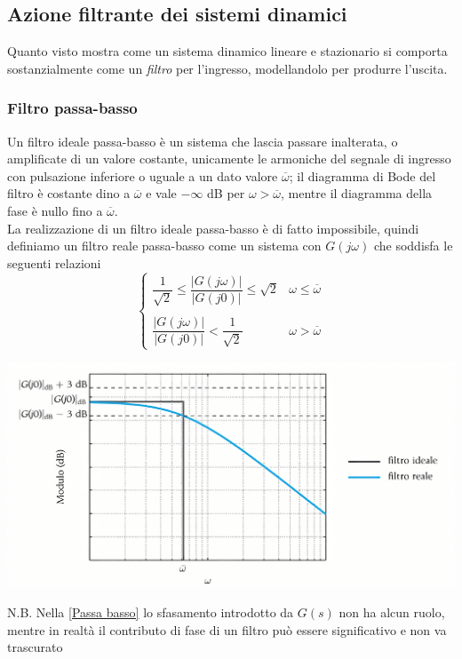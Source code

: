 \documentclass{article}
\numberwithin{equation}{subsection}
\let\oldsubsection\subsection%
\renewcommand{\subsection}{%
  \renewcommand{\theequation}{\thesubsection.\arabic{equation}}%
  \oldsubsection}%
\begin{document}
\subsection{Azione filtrante dei sistemi dinamici}
Quanto visto mostra come un sistema dinamico lineare e stazionario si comporta sostanzialmente come un \textit{filtro} per l'ingresso, modellandolo per produrre l'uscita.

\subsubsection{Filtro passa-basso}
Un filtro ideale passa-basso è un sistema che lascia passare inalterata, o amplificate di un valore costante, unicamente le armoniche del segnale di ingresso con pulsazione inferiore o uguale a un dato valore $\overline{\omega}$; il diagramma di Bode del filtro è costante dino a $\overline{\omega}$ e vale  $-\infty$ dB per $\omega > \overline{\omega}$, mentre il diagramma della fase è nullo fino a $\overline{\omega}$.\\
La realizzazione di un filtro ideale passa-basso è di fatto impossibile, quindi definiamo un filtro reale passa-basso come un sistema con $G(j\omega)$ che soddisfa le seguenti relazioni
\begin{equation}\label{Passa basso}
    \begin{cases}
        \dfrac{1}{\sqrt{2}} \leq \dfrac{|G(j\omega)|}{|G(j 0)|} \leq \sqrt{2} &\omega \leq \overline{\omega}\\
        \\
        \dfrac{|G(j\omega)|}{|G(j 0)|} < \dfrac{1}{\sqrt{2}} &\omega> \overline{\omega}
    \end{cases}
\end{equation}
\begin{center}
    \includegraphics[scale=0.125]{Images/Passa_basso.png}
\end{center}
N.B. Nella \ref{Passa basso} lo sfasamento introdotto da $G(s)$ non ha alcun ruolo, mentre in realtà il contributo di fase di un filtro può essere significativo e non va trascurato
\end{document}
